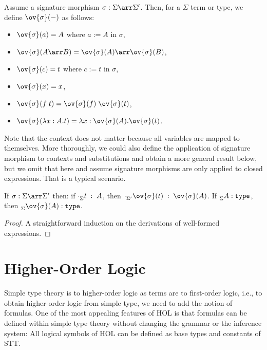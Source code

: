 \begin{definition}
Assume a signature morphism $\ismorph{\Sigma}{\Sigma'}{\sigma}$. Then, for a $\Sigma$ term or type, we define $\ov{\sigma}(-)$ as follows:
\begin{itemize}
     \item $\ov{\sigma}(a)=A$ where $a:=A$ in $\sigma$,
     \item $\ov{\sigma}(A\arr B)=\ov{\sigma}(A)\arr\ov{\sigma}(B)$,
     \item $\ov{\sigma}(c)=t$ where $c:=t$ in $\sigma$,
     \item $\ov{\sigma}(x)=x$,
     \item $\ov{\sigma}(f\;t)=\ov{\sigma}(f)\;\ov{\sigma}(t)$,
     \item $\ov{\sigma}(\lam{x}{A}t)=\lam{x}{\ov{\sigma}(A)}\ov{\sigma}(t)$.
\end{itemize}
\end{definition}

Note that the context does not matter because all variables are mapped to themselves. More thoroughly, we could also define the application of signature morphism to contexts and substitutions and obtain a more general result below, but we omit that here and assume signature morphisms are only applied to closed expressions. That is a typical scenario.

\begin{lemma}
If $\ismorph{\Sigma}{\Sigma'}{\sigma}$ then: if $\cdot^{}_{\Sigma}t\;:\;A$, then $\oftype{\Sigma'}{\cdot}{\ov{\sigma}(t)}{\ov{\sigma}(A)}$. If $^{}_{\Sigma}A:\mathtt{type}$, then $\istype{\Sigma}{\ov{\sigma}(A)}$.
\end{lemma}
\begin{proof}
A straightforward induction on the derivations of well-formed expressions.
\end{proof}


\section{Higher-Order Logic}

\renewcommand{\impl}{\Arr}

Simple type theory is to higher-order logic as terms are to first-order logic, i.e., to obtain higher-order logic from simple type, we need to add the notion of formulas. One of the most appealing features of HOL is that formulas can be defined within simple type theory without changing the grammar or the inference system: All logical symbols of HOL can be defined as base types and constants of STT.

